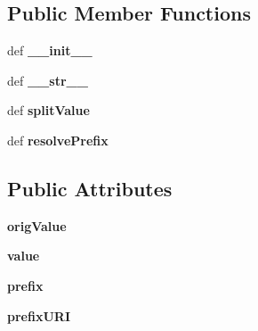 \subsection*{Public Member Functions}
\begin{DoxyCompactItemize}
\item 
\hypertarget{classcheshire3_1_1cql_parser_1_1_prefixed_object_a7973c8892ddd29456f022649e4accfc4}{def {\bfseries \-\_\-\-\_\-init\-\_\-\-\_\-}}\label{classcheshire3_1_1cql_parser_1_1_prefixed_object_a7973c8892ddd29456f022649e4accfc4}

\item 
\hypertarget{classcheshire3_1_1cql_parser_1_1_prefixed_object_acb0caf8d5bd6f8bbdd6de3c6b603a8ce}{def {\bfseries \-\_\-\-\_\-str\-\_\-\-\_\-}}\label{classcheshire3_1_1cql_parser_1_1_prefixed_object_acb0caf8d5bd6f8bbdd6de3c6b603a8ce}

\item 
\hypertarget{classcheshire3_1_1cql_parser_1_1_prefixed_object_ab95c818514c86e8cf28c59188c6d9fcf}{def {\bfseries split\-Value}}\label{classcheshire3_1_1cql_parser_1_1_prefixed_object_ab95c818514c86e8cf28c59188c6d9fcf}

\item 
\hypertarget{classcheshire3_1_1cql_parser_1_1_prefixed_object_ac6ae8bc66d6a5a8190f36f96b217e29f}{def {\bfseries resolve\-Prefix}}\label{classcheshire3_1_1cql_parser_1_1_prefixed_object_ac6ae8bc66d6a5a8190f36f96b217e29f}

\end{DoxyCompactItemize}
\subsection*{Public Attributes}
\begin{DoxyCompactItemize}
\item 
\hypertarget{classcheshire3_1_1cql_parser_1_1_prefixed_object_af3677d1531f6e87286f6e7e15743f1b9}{{\bfseries orig\-Value}}\label{classcheshire3_1_1cql_parser_1_1_prefixed_object_af3677d1531f6e87286f6e7e15743f1b9}

\item 
\hypertarget{classcheshire3_1_1cql_parser_1_1_prefixed_object_a825e2dfb60188028c703ea6fcb31d04f}{{\bfseries value}}\label{classcheshire3_1_1cql_parser_1_1_prefixed_object_a825e2dfb60188028c703ea6fcb31d04f}

\item 
\hypertarget{classcheshire3_1_1cql_parser_1_1_prefixed_object_ad9020469ec49948336adfdcb543f1b57}{{\bfseries prefix}}\label{classcheshire3_1_1cql_parser_1_1_prefixed_object_ad9020469ec49948336adfdcb543f1b57}

\item 
\hypertarget{classcheshire3_1_1cql_parser_1_1_prefixed_object_a1715d7ed2b8f08d1b1c72b834512a827}{{\bfseries prefix\-U\-R\-I}}\label{classcheshire3_1_1cql_parser_1_1_prefixed_object_a1715d7ed2b8f08d1b1c72b834512a827}

\end{DoxyCompactItemize}
